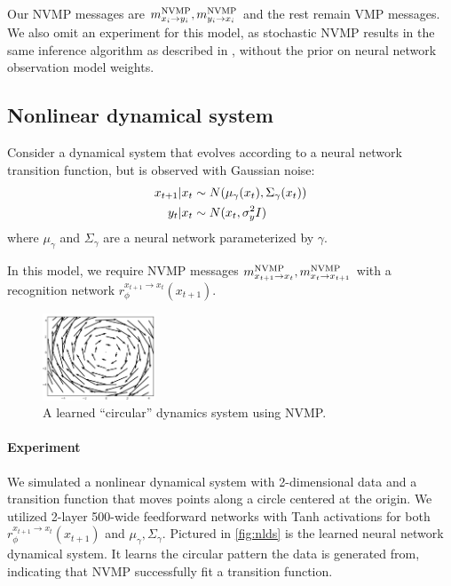 Our NVMP messages are $m^{\text{NVMP}}_{x_i \rightarrow y_i}, m^{\text{NVMP}}_{y_i \rightarrow x_i}$
and the rest remain VMP messages. We also omit an experiment
for this model, as stochastic NVMP
results in the same inference algorithm as described in \cite{svae},
without the prior on neural network observation model weights.

\subsection{Nonlinear dynamical system}
Consider a dynamical system that evolves
according to a neural
network transition function, but is observed with Gaussian noise:
\begin{align*}
    x_{t + 1} | x_t &\sim N(\mu_\gamma(x_t), \Sigma_\gamma(x_t)) \\
    y_t | x_t &\sim N(x_t, \sigma^2_yI)
\end{align*}
where $\mu_\gamma$ and $\Sigma_\gamma$ are a neural network parameterized by $\gamma$.

In this model, we require NVMP messages $m^{\text{NVMP}}_{x_{t + 1} \rightarrow x_t}, m^{\text{NVMP}}_{x_t \rightarrow x_{t + 1}}$ with a recognition network $r^{x_{t + 1} \rightarrow x_t}_\phi(x_{t + 1})$.

\begin{figure}
    \centering
    \includegraphics[width=0.3\textwidth]{img/nvmp/nlds}
    \caption{A learned ``circular'' dynamics system using NVMP.}
    \label{fig:nlds}
\end{figure}

\paragraph{Experiment} We simulated a nonlinear dynamical system
with 2-dimensional data and a transition function
that moves points along a circle centered at the origin.
We utilized 2-layer 500-wide feedforward networks with Tanh activations
for both $r^{x_{t + 1} \rightarrow x_t}_\phi(x_{t + 1})$ and $\mu_\gamma, \Sigma_\gamma$.
Pictured in \autoref{fig:nlds} is the learned neural network dynamical system.
It learns the circular pattern the data is generated from, indicating
that NVMP successfully fit a transition function.

